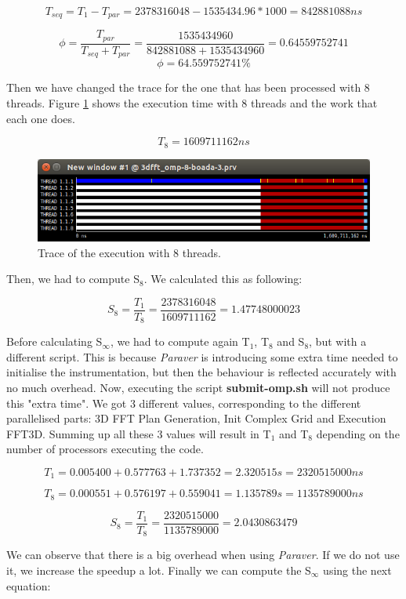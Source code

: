 \documentclass[12pt, a4paper]{article}
\begin{document}
\[T_{seq} = T_1 - T_{par} = 2378316048 - 1535434.96 * 1000 = 842881088 ns \]

\[\phi = \dfrac{T_{par}} {T_{seq} + T_{par}} = \dfrac{1535434960} {842881088 + 1535434960} = 0.64559752741 \]
\[\phi = 64.559752741\%\]

Then we have changed the trace for the one that has been processed with 8 threads. Figure \ref{v0_t8} shows the execution time with 8 threads and the work that each one does.

\[T_{8} = 1609711162 ns \]

\begin{figure}[H]
  \centering
  \includegraphics[scale=0.5]{./images/v0_t8}
  \caption{Trace of the execution with 8 threads.}
  \label{v0_t8}
\end{figure}

Then, we had to compute S$_8$. We calculated this as following:

\[ S_{8} = \dfrac{T_{1}}{T_{8}} = \dfrac{2378316048} {1609711162} = 1.47748000023 \]

Before calculating S$_\infty$, we had to compute again T$_1$, T$_8$ and S$_8$, but with a different script. This is because \textit{Paraver} is introducing some extra time needed to initialise the instrumentation, but then the behaviour is reflected accurately with no much overhead. Now, executing the script \textbf{submit-omp.sh} will not produce this "extra time". We got 3 different values, corresponding to the different parallelised parts: 3D FFT Plan Generation, Init Complex Grid and Execution FFT3D. Summing up all these 3 values will result in T$_1$ and T$_8$ depending on the number of processors executing the code.

\[T_1 = 0.005400 + 0.577763 + 1.737352 = 2.320515 s = 2320515000 ns \]

\[T_8 = 0.000551 + 0.576197 + 0.559041 = 1.135789 s = 1135789000 ns \]

\[S_8 = \dfrac{T_1}{T_8} = \dfrac{2320515000}{1135789000} = 2.0430863479 \]

We can observe that there is a big overhead when using \textit{Paraver}. If we do not use it, we increase the speedup a lot. Finally we can compute the S$_\infty$ using the next equation:
\end{document}
